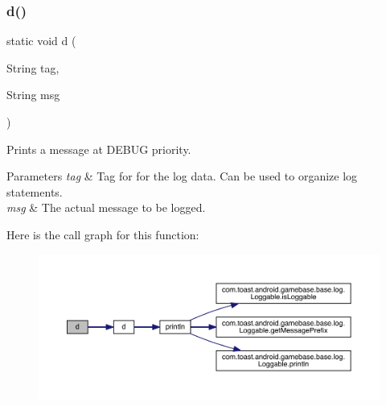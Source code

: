 \subsubsection{\texorpdfstring{d()}{d()}\hspace{0.1cm}{\footnotesize\ttfamily [2/2]}}
{\footnotesize\ttfamily static void d (\begin{DoxyParamCaption}\item[{String}]{tag,  }\item[{String}]{msg }\end{DoxyParamCaption})\hspace{0.3cm}{\ttfamily [static]}}



Prints a message at D\+E\+B\+UG priority. 


\begin{DoxyParams}{Parameters}
{\em tag} & Tag for for the log data. Can be used to organize log statements. \\
\hline
{\em msg} & The actual message to be logged. \\
\hline
\end{DoxyParams}
Here is the call graph for this function\+:
\nopagebreak
\begin{figure}[H]
\begin{center}
\leavevmode
\includegraphics[width=350pt]{classcom_1_1toast_1_1android_1_1gamebase_1_1base_1_1log_1_1_logger_af4bcd771ce8eb05ccff9b8ae421dbe32_cgraph}
\end{center}
\end{figure}
\mbox{\label{classcom_1_1toast_1_1android_1_1gamebase_1_1base_1_1log_1_1_logger_a31c4de083ef2003f9fb433d639866537}} 

